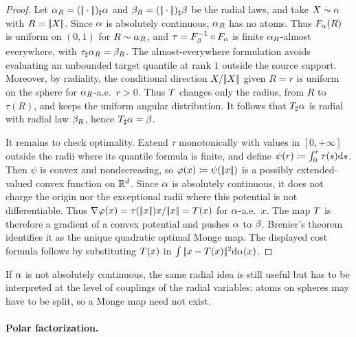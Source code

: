 \begin{proof}
	Let $\alpha_R=(|\!| \cdot |\!|)_\sharp\alpha$ and $\beta_R=(|\!| \cdot |\!|)_\sharp\beta$ be the radial laws, and take $X\sim\alpha$ with $R=|\!| X |\!|$. Since $\alpha$ is absolutely continuous, $\alpha_R$ has no atoms. Thus $F_\alpha(R)$ is uniform on $(0,1)$ for $R\sim\alpha_R$, and $\tau=F_\beta^{-1}\circ F_\alpha$ is finite $\alpha_R$-almost everywhere, with $\tau_\sharp\alpha_R=\beta_R$. The almost-everywhere formulation avoids evaluating an unbounded target quantile at rank $1$ outside the source support. Moreover, by radiality, the conditional direction $X/|\!| X |\!|$ given $R=r$ is uniform on the sphere for $\alpha_R$-a.e.\ $r>0$. Thus $T$ changes only the radius, from $R$ to $\tau(R)$, and keeps the uniform angular distribution. It follows that $T_\sharp\alpha$ is radial with radial law $\beta_R$, hence $T_\sharp\alpha=\beta$.

	It remains to check optimality. Extend $\tau$ monotonically with values in $[0,+\infty]$ outside the radii where its quantile formula is finite, and define $\psi(r)\coloneqq\int_0^r\tau(s)\mathrm{d} s$. Then $\psi$ is convex and nondecreasing, so $\varphi(x)\coloneqq\psi(|\!| x |\!|)$ is a possibly extended-valued convex function on $\mathbb{R}^d$. Since $\alpha$ is absolutely continuous, it does not charge the origin nor the exceptional radii where this potential is not differentiable. Thus
	$\nabla\varphi(x)=\tau(|\!| x |\!|)x/|\!| x |\!|=T(x)$ for $\alpha$-a.e.\ $x$.
	The map $T$ is therefore a gradient of a convex potential and pushes $\alpha$ to $\beta$. Brenier's theorem identifies it as the unique quadratic optimal Monge map. The displayed cost formula follows by substituting $T(x)$ in $\int|\!| x-T(x) |\!|^2\mathrm{d}\alpha(x)$.
\end{proof}

If $\alpha$ is not absolutely continuous, the same radial idea is still useful but has to be interpreted at the level of couplings of the radial variables: atoms on spheres may have to be split, so a Monge map need not exist.

\paragraph{Polar factorization.}

